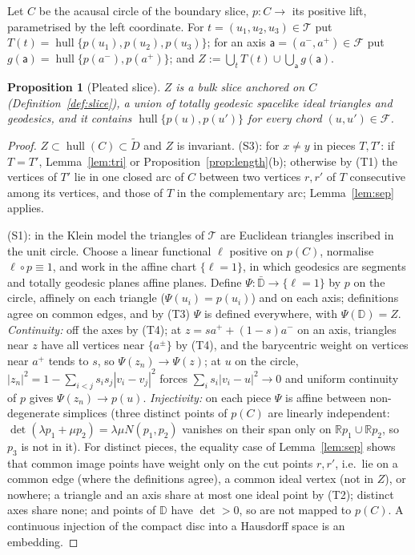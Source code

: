 \documentclass[aps,prd,onecolumn,superscriptaddress,nofootinbib,amsmath,amssymb,11pt]{revtex4-2}
\newtheorem{proposition}[theorem]{Proposition}
\theoremstyle{definition}
\newcommand{\R}{\mathbb{R}}
\newcommand{\Dt}{\tilde D}
\newcommand{\hull}{\operatorname{hull}}
\begin{document}
Let $C$ be the acausal circle of the boundary slice, $p:C\to$ its positive lift, parametrised by the left coordinate. For
$t=(u_1,u_2,u_3)\in\mathcal T$ put $T(t)=\hull\{p(u_1),p(u_2),p(u_3)\}$; for an axis $\mathsf a=(a^-,a^+)\in\mathcal F$ put
$g(\mathsf a)=\hull\{p(a^-),p(a^+)\}$; and $Z:=\bigcup_tT(t)\cup\bigcup_{\mathsf a}g(\mathsf a)$.

\begin{proposition}[Pleated slice]\label{prop:P}
$Z$ is a bulk slice anchored on $C$ (Definition~\ref{def:slice}), a union of totally geodesic spacelike ideal triangles and
geodesics, and it contains $\hull\{p(u),p(u')\}$ for every chord $(u,u')\in\mathcal F$.
\end{proposition}

\begin{proof}
$Z\subset\hull(C)\subset\Dt$ and $Z$ is invariant. (S3): for $x\ne y$ in pieces $T,T'$: if $T=T'$, Lemma~\ref{lem:tri} or
Proposition~\ref{prop:length}(b); otherwise by (T1) the vertices of $T'$ lie in one closed arc of $C$ between two vertices
$r,r'$ of $T$ consecutive among its vertices, and those of $T$ in the complementary arc; Lemma~\ref{lem:sep} applies.

(S1): in the Klein model the triangles of $\mathcal T$ are Euclidean triangles inscribed in the unit circle. Choose a linear
functional $\ell$ positive on $p(C)$, normalise $\ell\circ p\equiv1$, and work in the affine chart $\{\ell=1\}$, in which
geodesics are segments and totally geodesic planes affine planes. Define $\Psi:\bar{\mathbb D}\to\{\ell=1\}$ by $p$ on the circle,
affinely on each triangle ($\Psi(u_i)=p(u_i)$) and on each axis; definitions agree on common edges, and by (T3) $\Psi$ is
defined everywhere, with $\Psi(\mathbb D)=Z$.
\emph{Continuity:} off the axes by (T4); at $z=sa^++(1-s)a^-$ on an axis, triangles near $z$ have all vertices near
$\{a^\pm\}$ by (T4), and the barycentric weight on vertices near $a^+$ tends to $s$, so $\Psi(z_n)\to\Psi(z)$; at $u$ on the circle,
$|z_n|^2=1-\sum_{i<j}s_is_j|v_i-v_j|^2$ forces $\sum_is_i|v_i-u|^2\to0$ and uniform continuity of $p$ gives $\Psi(z_n)\to p(u)$.
\emph{Injectivity:} on each piece $\Psi$ is affine between non-degenerate simplices (three distinct points of $p(C)$ are linearly
independent: $\det(\lambda p_1+\mu p_2)=\lambda\mu N(p_1,p_2)$ vanishes on their span only on $\R p_1\cup\R p_2$, so $p_3$ is not in it).
For distinct pieces, the equality case of Lemma~\ref{lem:sep} shows that common image points have weight only on the cut
points $r,r'$, i.e.\ lie on a common edge (where the definitions agree), a common ideal vertex (not in $Z$), or nowhere; a
triangle and an axis share at most one ideal point by (T2); distinct axes share none; and points of $\mathbb D$ have $\det>0$,
so are not mapped to $p(C)$. A continuous injection of the compact disc into a Hausdorff space is an embedding.
\end{proof}
\end{document}
